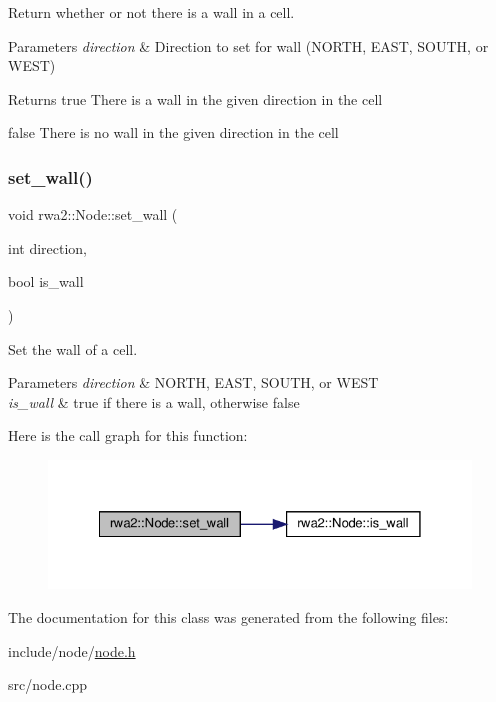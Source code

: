 Return whether or not there is a wall in a cell. 


\begin{DoxyParams}{Parameters}
{\em direction} & Direction to set for wall (N\+O\+R\+TH, E\+A\+ST, S\+O\+U\+TH, or W\+E\+ST) \\
\hline
\end{DoxyParams}
\begin{DoxyReturn}{Returns}
true There is a wall in the given direction in the cell 

false There is no wall in the given direction in the cell 
\end{DoxyReturn}
\mbox{\label{classrwa2_1_1_node_a9e887221d02616392f572dd4018b71ed}} 
\subsubsection{\texorpdfstring{set\+\_\+wall()}{set\_wall()}}
{\footnotesize\ttfamily void rwa2\+::\+Node\+::set\+\_\+wall (\begin{DoxyParamCaption}\item[{int}]{direction,  }\item[{bool}]{is\+\_\+wall }\end{DoxyParamCaption})}



Set the wall of a cell. 


\begin{DoxyParams}{Parameters}
{\em direction} & N\+O\+R\+TH, E\+A\+ST, S\+O\+U\+TH, or W\+E\+ST \\
\hline
{\em is\+\_\+wall} & true if there is a wall, otherwise false \\
\hline
\end{DoxyParams}
Here is the call graph for this function\+:\nopagebreak
\begin{figure}[H]
\begin{center}
\leavevmode
\includegraphics[width=328pt]{classrwa2_1_1_node_a9e887221d02616392f572dd4018b71ed_cgraph}
\end{center}
\end{figure}


The documentation for this class was generated from the following files\+:\begin{DoxyCompactItemize}
\item 
include/node/\hyperlink{node_8h}{node.\+h}\item 
src/node.\+cpp\end{DoxyCompactItemize}
